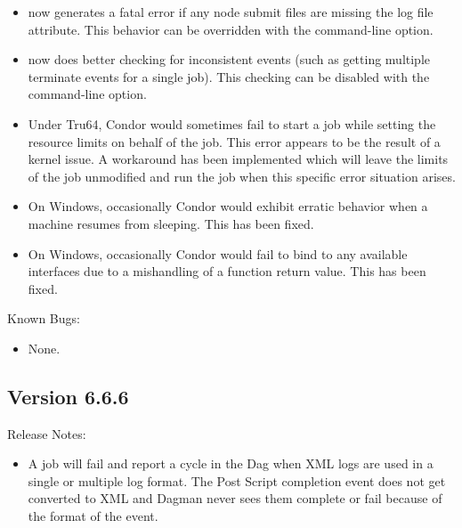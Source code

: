 \begin{itemize}
\item {} now generates a fatal error if any node submit
files are missing the log file attribute.  This behavior can be
overridden with the  command-line option.

\item {} now does better checking for inconsistent events
(such as getting multiple terminate events for a single job).  This
checking can be disabled with the  command-line
option.

\item Under Tru64, Condor would sometimes fail to start a job while
	setting the resource limits on behalf of the job.
	This error appears to be the result of a kernel issue.
	A workaround has been implemented which will leave the limits
	of the job unmodified and run the job when this specific error
	situation arises.

\item On Windows, occasionally Condor would exhibit erratic behavior
when a machine resumes from sleeping. This has been fixed.

\item On Windows, occasionally Condor would fail to bind to any available
interfaces due to a mishandling of a function return value. This has
been fixed.

\end{itemize}

\noindent Known Bugs:

\begin{itemize}

\item None.

\end{itemize}


\subsection{\label{sec:New-6-6-6}Version 6.6.6}

\noindent Release Notes:

\begin{itemize}

\item A  job will fail and report a cycle in the Dag
when XML logs are used in a single or multiple log format. The Post
Script  completion event does not get converted to XML and Dagman
never sees them complete or fail because of the format of the event.

\end{itemize}


